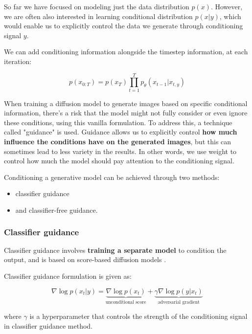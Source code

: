 So far we have focused on modeling just the data distribution $p(x)$. However, we are often also interested in learning conditional distribution $p(x|y)$, which would enable us to explicitly control the data we generate through conditioning signal $y$.

We can add conditioning information alongside the timestep information, at each iteration:

\[
p(x_{0:T}) = p(x_T) \prod_{t=1}^{T} p_\theta (x_{t-1} | x_{t, y})
\]

When training a diffusion model to generate images based on specific conditional information, there's a risk that the model might not fully consider or even ignore these conditions, using this vanilla formulation. To address this, a technique called "guidance" is used. Guidance allows us to explicitly control \textbf{how much influence the conditions have on the generated images}, but this can sometimes lead to less variety in the results. In other words, we use weight to control how much the model should pay attention to the conditioning signal.


Conditioning a generative model can be achieved through two methods: 

\begin{itemize}
    \item classifier guidance
    \item and classifier-free guidance.
\end{itemize}





\subsubsection*{Classifier guidance}

Classifier guidance \cite{openai_diffusion_beats_gans} involves \textbf{training a separate model} to condition the output, and is based on score-based diffusion models \cite{score_based_generative_modeling}. 

Classifier guidance formulation is given as:

\[
\nabla \log p(x_t | y) = \underbrace{\nabla \log p(x_t)}_{\text{unconditional score}} + \underbrace{\gamma \nabla \log p(y | x_t)}_{\text{adversarial gradient}}
\]

where $\gamma$ is a hyperparameter that controls the strength of the conditioning signal in classifier guidance method.








